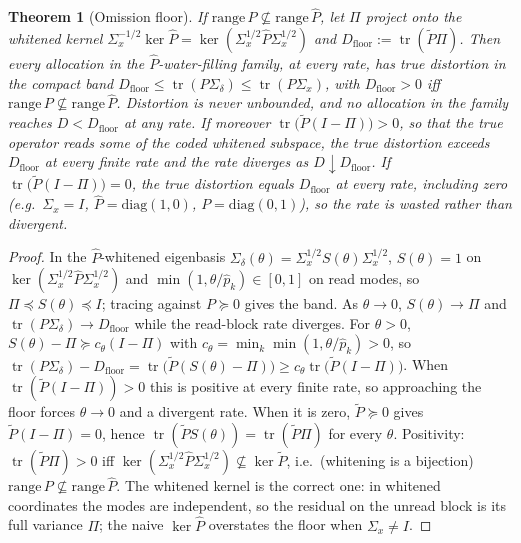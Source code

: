 \documentclass[11pt]{article}
\newtheorem{theorem}{Theorem}
\theoremstyle{definition}
\theoremstyle{remark}
\newcommand{\tr}{\operatorname{tr}}
\begin{document}
\begin{theorem}[Omission floor]\label{thm:omission}
If $\mathrm{range}\,P\not\subseteq\mathrm{range}\,\hat P$, let $\Pi$ project onto the
\emph{whitened} kernel $\Sigma_x^{-1/2}\ker\hat P=\ker(\Sigma_x^{1/2}\hat P\Sigma_x^{1/2})$
and $D_{\mathrm{floor}}:=\tr(\tilde P\Pi)$. Then every allocation in the $\hat
P$-water-filling family, at every rate, has true distortion in the compact band
$D_{\mathrm{floor}}\le\tr(P\Sigma_\delta)\le\tr(P\Sigma_x)$, with $D_{\mathrm{floor}}>0$
iff $\mathrm{range}\,P\not\subseteq\mathrm{range}\,\hat P$. Distortion is never unbounded,
and no allocation in the family reaches $D<D_{\mathrm{floor}}$ at any rate. If moreover
$\tr\big(\tilde P(I-\Pi)\big)>0$, so that the true operator reads some of the coded
whitened subspace, the true distortion exceeds $D_{\mathrm{floor}}$ at every finite rate
and the rate diverges as $D\downarrow D_{\mathrm{floor}}$. If
$\tr\big(\tilde P(I-\Pi)\big)=0$, the true distortion equals $D_{\mathrm{floor}}$ at every
rate, including zero (e.g.\ $\Sigma_x=I$, $\hat P=\mathrm{diag}(1,0)$,
$P=\mathrm{diag}(0,1)$), so the rate is wasted rather than divergent.
\end{theorem}
\begin{proof}
In the $\hat P$-whitened eigenbasis $\Sigma_\delta(\theta)=\Sigma_x^{1/2}S(\theta)
\Sigma_x^{1/2}$, $S(\theta)=1$ on $\ker(\Sigma_x^{1/2}\hat P\Sigma_x^{1/2})$ and
$\min(1,\theta/\hat p_k)\in[0,1]$ on read modes, so $\Pi\preceq S(\theta)\preceq I$;
tracing against $P\succeq0$ gives the band. As $\theta\to0$, $S(\theta)\to\Pi$ and
$\tr(P\Sigma_\delta)\to D_{\mathrm{floor}}$ while the read-block rate diverges. For
$\theta>0$, $S(\theta)-\Pi\succeq c_\theta(I-\Pi)$ with
$c_\theta=\min_k\min(1,\theta/\hat p_k)>0$, so
$\tr(P\Sigma_\delta)-D_{\mathrm{floor}}=\tr\big(\tilde P(S(\theta)-\Pi)\big)\ge
c_\theta\tr\big(\tilde P(I-\Pi)\big)$. When $\tr(\tilde P(I-\Pi))>0$ this is positive at
every finite rate, so approaching the floor forces $\theta\to0$ and a divergent rate. When
it is zero, $\tilde P\succeq0$ gives $\tilde P(I-\Pi)=0$, hence
$\tr(\tilde P S(\theta))=\tr(\tilde P\Pi)$ for every $\theta$. Positivity:
$\tr(\tilde P\Pi)>0$ iff $\ker(\Sigma_x^{1/2}\hat P\Sigma_x^{1/2})\not\subseteq\ker\tilde
P$, i.e.\ (whitening is a bijection) $\mathrm{range}\,P\not\subseteq\mathrm{range}\,\hat
P$. The whitened kernel is the correct one: in whitened coordinates the modes are
independent, so the residual on the unread block is its full variance $\Pi$; the naive
$\ker\hat P$ overstates the floor when $\Sigma_x\ne I$.
\end{proof}
\end{document}
